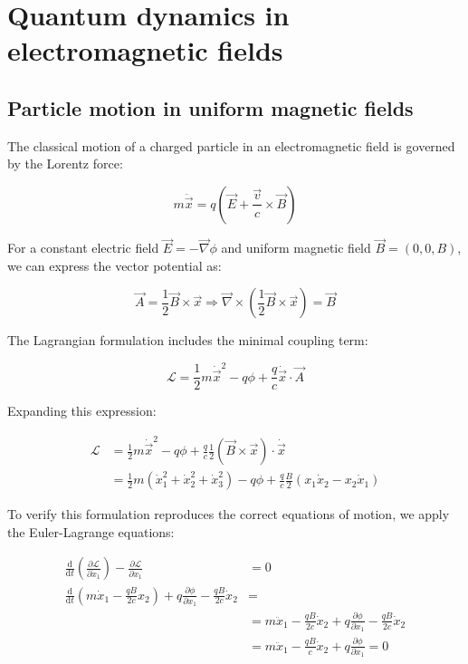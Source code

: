 \chapter{Quantum dynamics in electromagnetic fields}
\section{Particle motion in uniform magnetic fields}
The classical motion of a charged particle in an electromagnetic field is governed by the Lorentz force:

\begin{equation}
m \ddot{\vec{x}}=q(\vec{E}+\frac{\vec{v}}{c} \times \vec{B})
\end{equation}

For a constant electric field $\vec{E}=-\vec{\nabla} \phi$ and uniform magnetic field $\vec{B}=(0,0,B)$, we can express the vector potential as:

\begin{equation}
\vec{A}=\frac{1}{2} \vec{B} \times \vec{x} \Rightarrow \vec{\nabla} \times(\frac{1}{2} \vec{B} \times \vec{x})=\vec{B}
\end{equation}

The Lagrangian formulation includes the minimal coupling term:

\begin{equation}
\mathcal{L}=\frac{1}{2} m \dot{\vec{x}}^{2}-q \phi+\frac{q}{c} \dot{\vec{x}} \cdot \vec{A}
\end{equation}

Expanding this expression:

\begin{align}
\mathcal{L} &= \frac{1}{2} m \dot{\vec{x}}^{2}-q \phi+\frac{q}{c} \frac{1}{2} (\vec{B} \times \vec{x}) \cdot \dot{\vec{x}}\\
&= \frac{1}{2} m(\dot{x}_{1}^{2}+\dot{x}_{2}^{2}+\dot{x}_{3}^{2})-q \phi+\frac{q}{c} \frac{B}{2}(x_{1} \dot{x}_{2}-x_{2}\dot{x}_{1})
\end{align}

To verify this formulation reproduces the correct equations of motion, we apply the Euler-Lagrange equations:

\begin{align}
\frac{\mathrm{d}}{\mathrm{d} t}(\frac{\partial \mathcal{L}}{\partial \dot{x}_{1}})-\frac{\partial \mathcal{L}}{\partial x_{1}} &= 0 \\
\frac{\mathrm{d}}{\mathrm{d} t}(m \dot{x}_{1}-\frac{q B}{2 c} x_{2})+q \frac{\partial \phi}{\partial x_{1}}-\frac{q B}{2 c} \dot{x}_{2} &= \\
&= m \ddot{x}_{1}-\frac{q B}{2 c} \dot{x}_{2}+q \frac{\partial \phi}{\partial x_{1}}-\frac{q B}{2 c} \dot{x}_{2}\\
&= m \ddot{x}_{1}-\frac{q B}{c} \dot{x}_{2}+q \frac{\partial \phi}{\partial x_{1}}=0
\end{align}

